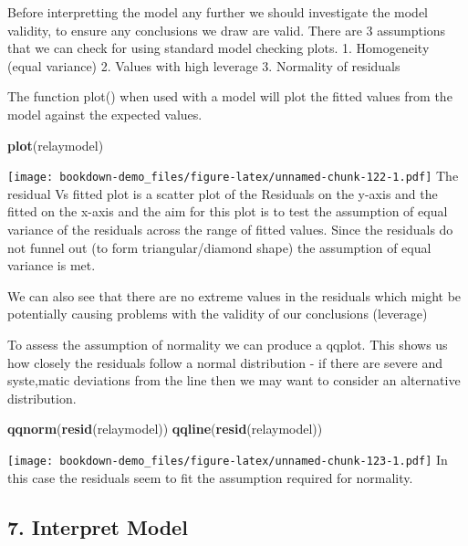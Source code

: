 \documentclass[]{book}
\newenvironment{Shaded}{\begin{snugshade}}{\end{snugshade}}
\newcommand{\KeywordTok}[1]{\textcolor[rgb]{0.13,0.29,0.53}{\textbf{#1}}}
\newcommand{\NormalTok}[1]{#1}
\theoremstyle{definition}
\theoremstyle{definition}
\theoremstyle{definition}
\theoremstyle{remark}
\begin{document}
Before interpretting the model any further we should investigate the
model validity, to ensure any conclusions we draw are valid. There are 3
assumptions that we can check for using standard model checking plots.
1. Homogeneity (equal variance) 2. Values with high leverage 3.
Normality of residuals

The function plot() when used with a model will plot the fitted values
from the model against the expected values.

\begin{Shaded}
\begin{Highlighting}[]
\KeywordTok{plot}\NormalTok{(relaymodel)}
\end{Highlighting}
\end{Shaded}

\texttt{[image: bookdown-demo\_files/figure-latex/unnamed-chunk-122-1.pdf]}
The residual Vs fitted plot is a scatter plot of the Residuals on the
y-axis and the fitted on the x-axis and the aim for this plot is to test
the assumption of equal variance of the residuals across the range of
fitted values. Since the residuals do not funnel out (to form
triangular/diamond shape) the assumption of equal variance is met.

We can also see that there are no extreme values in the residuals which
might be potentially causing problems with the validity of our
conclusions (leverage)

To assess the assumption of normality we can produce a qqplot. This
shows us how closely the residuals follow a normal distribution - if
there are severe and syste,matic deviations from the line then we may
want to consider an alternative distribution.

\begin{Shaded}
\begin{Highlighting}[]
\KeywordTok{qqnorm}\NormalTok{(}\KeywordTok{resid}\NormalTok{(relaymodel))}
\KeywordTok{qqline}\NormalTok{(}\KeywordTok{resid}\NormalTok{(relaymodel))}
\end{Highlighting}
\end{Shaded}

\texttt{[image: bookdown-demo\_files/figure-latex/unnamed-chunk-123-1.pdf]}
In this case the residuals seem to fit the assumption required for
normality.

\subsection{7. Interpret Model}\label{interpret-model-3}
\end{document}
